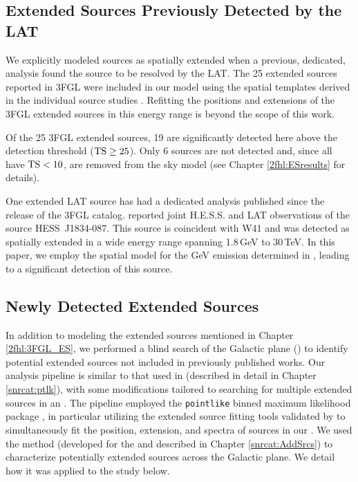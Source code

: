 %
%

\subsection{\label{2fhl:3FGL_ES}Extended Sources Previously Detected by the LAT}
We explicitly modeled sources as spatially extended when a previous, dedicated, analysis found the source to be resolved by the LAT.
The 25 extended sources reported in 3FGL were included in our model using the spatial templates derived in the individual source studies \citep[see references in ][]{3FGL}. Refitting the positions and extensions of the 3FGL extended sources in this energy range is beyond the scope of this work.

Of the 25 3FGL extended sources, 19 are significantly detected here above the detection threshold (${\rm TS}\geq25$). Only 6 sources are not detected and, since all have  ${\rm TS<10}$, are removed from the sky model (see Chapter \ref{2fhl:ESresults} for details).

One extended LAT source has had a dedicated analysis published since the release of the 3FGL catalog. \cite{HESSLATW41} reported joint H.E.S.S. and LAT observations of the \vhe{} source HESS~J1834-087. This source is coincident with \snr{} W41 and was detected  as spatially extended in a wide energy range spanning 1.8\,GeV to 30\,TeV. In this paper, we employ the spatial model for the GeV emission determined in \cite{HESSLATW41}, leading to a significant detection of this source.


%
%
\subsection{\label{2fhl:newES}Newly Detected Extended Sources} %

In addition to modeling the extended sources mentioned in Chapter \ref{2fhl:3FGL_ES}, we performed a blind search of the Galactic plane  (\blat) to identify potential extended sources not included in previously published works. Our analysis pipeline is similar to that used in \cite{snrCat} (described in detail in Chapter \ref{snrcat:ptlk}), with some modifications tailored to searching for multiple extended sources in an \roi{}. The pipeline employed the {\tt pointlike} binned maximum likelihood package \citep{Kerr10}, in particular utilizing the extended source fitting tools validated by \cite{Lande12} to simultaneously fit the position, extension, and spectra of sources in our \rois{}. We used the \srcs{} method (developed for the \snrcat{} and described in Chapter \ref{snrcat:AddSrcs}) to characterize potentially extended sources across the Galactic plane. We detail how it was applied to the \twofhl{} study below.

